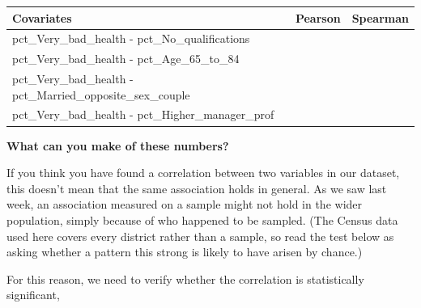 \documentclass[
  letterpaper,
  DIV=11,
  numbers=noendperiod]{scrreprt}
\newenvironment{Shaded}{\begin{snugshade}}{\end{snugshade}}
\newcommand{\AttributeTok}[1]{\textcolor[rgb]{0.40,0.45,0.13}{#1}}
\newcommand{\CommentTok}[1]{\textcolor[rgb]{0.37,0.37,0.37}{#1}}
\newcommand{\FunctionTok}[1]{\textcolor[rgb]{0.28,0.35,0.67}{#1}}
\newcommand{\NormalTok}[1]{\textcolor[rgb]{0.00,0.23,0.31}{#1}}
\newcommand{\OtherTok}[1]{\textcolor[rgb]{0.00,0.23,0.31}{#1}}
\newcommand{\SpecialCharTok}[1]{\textcolor[rgb]{0.37,0.37,0.37}{#1}}
\newcommand{\StringTok}[1]{\textcolor[rgb]{0.13,0.47,0.30}{#1}}
\newcounter{none} %
\begin{document}
{\def\LTcaptype{none} %
\begin{longtable}[]{@{}
  >{\raggedright\arraybackslash}p{}
  >{\raggedright\arraybackslash}p{}
  >{\raggedright\arraybackslash}p{}@{}}
\toprule\noalign{}
\begin{minipage}[b]{\linewidth}\raggedright
Covariates
\end{minipage} & \begin{minipage}[b]{\linewidth}\raggedright
Pearson
\end{minipage} & \begin{minipage}[b]{\linewidth}\raggedright
Spearman
\end{minipage} \\
\midrule\noalign{}
\endhead
\bottomrule\noalign{}
\endlastfoot
pct\_Very\_bad\_health - pct\_No\_qualifications & & \\
pct\_Very\_bad\_health - pct\_Age\_65\_to\_84 & & \\
pct\_Very\_bad\_health - pct\_Married\_opposite\_sex\_couple & & \\
pct\_Very\_bad\_health - pct\_Higher\_manager\_prof & & \\
\end{longtable}
}

\textbf{What can you make of these numbers?}

If you think you have found a correlation between two variables in our
dataset, this doesn't mean that the same association holds in general.
As we saw last week, an association measured on a sample might not hold
in the wider population, simply because of who happened to be sampled.
(The Census data used here covers every district rather than a sample,
so read the test below as asking whether a pattern this strong is likely
to have arisen by chance.)

For this reason, we need to verify whether the correlation is
statistically significant,

\begin{Shaded}
\end{Shaded}
\end{document}
